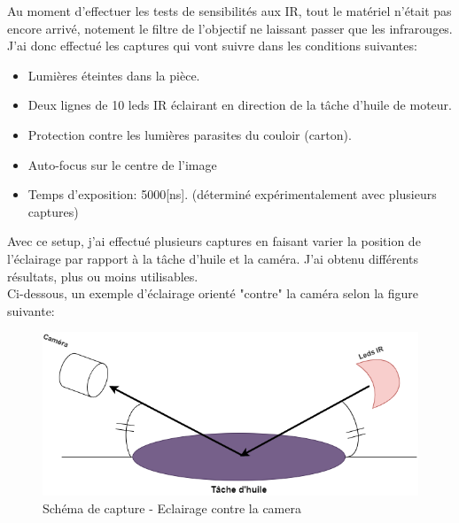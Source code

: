 Au moment d'effectuer les tests de sensibilités aux IR, tout le matériel n'était pas encore arrivé, notement le filtre de l'objectif ne
laissant passer que les infrarouges. J'ai donc effectué les captures qui vont suivre dans les conditions suivantes:
\begin{itemize}
    \item Lumières éteintes dans la pièce.
    \item Deux lignes de 10 leds IR éclairant en direction de la tâche d'huile de moteur.
    \item Protection contre les lumières parasites du couloir (carton).
    \item Auto-focus sur le centre de l'image
    \item Temps d'exposition: 5000[ns]. (déterminé expérimentalement avec plusieurs captures)
\end{itemize}
Avec ce setup, j'ai effectué plusieurs captures en faisant varier la position de l'éclairage par rapport à la tâche d'huile et la caméra.
J'ai obtenu différents résultats, plus ou moins utilisables.\\
Ci-dessous, un exemple d'éclairage orienté "contre" la caméra selon la figure suivante:\\
\begin{figure}[H]
    \centering
    \includegraphics[width=13cm]{assets/figures/eclairage_contre_camera.png}
    \caption{Schéma de capture - Eclairage contre la camera}
\end{figure}


